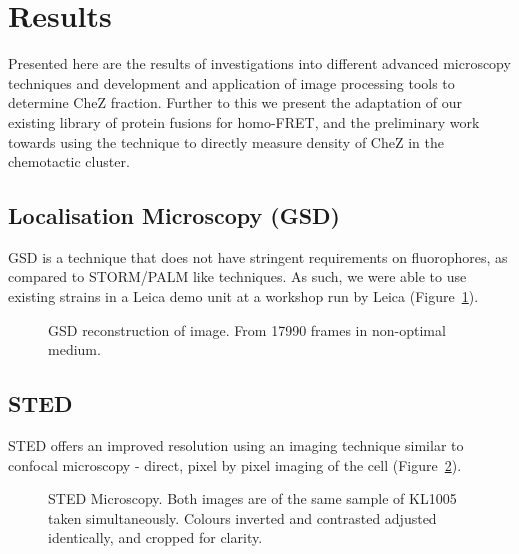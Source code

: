 \documentclass[../main.tex]{subfiles}
\begin{document}
\section{Results}

Presented here are the results of investigations into different advanced microscopy techniques and development and application of image processing tools to determine CheZ fraction. Further to this we present the adaptation of our existing library of protein fusions for homo-FRET, and the preliminary work towards using the technique to directly measure density of CheZ in the chemotactic cluster.

\subsection{Localisation Microscopy (GSD)}

GSD is a technique that does not have stringent requirements on fluorophores, as compared to STORM/PALM like techniques. As such, we were able to use existing strains in a Leica demo unit at a workshop run by Leica (Figure~\ref{fig:results:palm}).

\begin{figure}[h!]
\begin{center}
\caption[GSD reconstruction]{GSD reconstruction of image. From 17990 frames in non-optimal medium.}
\label{fig:results:palm}
\end{center}
\end{figure}
\newpage
\subsection{STED}

STED offers an improved resolution using an imaging technique similar to confocal microscopy - direct, pixel by pixel imaging of the cell (Figure~\ref{fig:results:sted}).

\begin{figure}[h!]
\begin{center}
\caption[STED microscopy]{STED Microscopy. Both images are of the same sample of KL1005 taken simultaneously. Colours inverted and contrasted adjusted identically, and cropped for clarity.}
\label{fig:results:sted}
\end{center}
\end{figure}
\newpage
\end{document}
